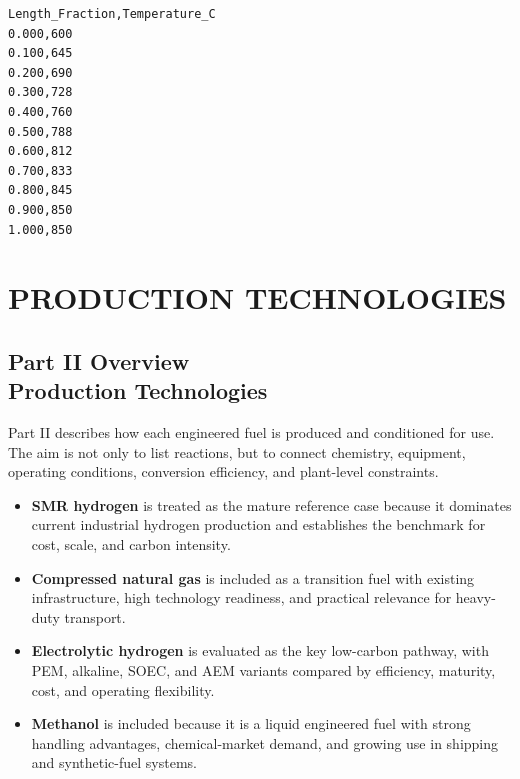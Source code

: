\documentclass[12pt,twoside,openany]{book}
\let\cleardoublepage\clearpage
\begin{document}
\begin{lstlisting}[language={}, caption={TEMP\_PROFILE.txt}, label=lst:temp]
Length_Fraction,Temperature_C
0.000,600
0.100,645
0.200,690
0.300,728
0.400,760
0.500,788
0.600,812
0.700,833
0.800,845
0.900,850
1.000,850
\end{lstlisting}


\part{PRODUCTION TECHNOLOGIES}

\cleardoublepage
{}
\chapter*{Part II Overview\\Production Technologies}

Part II describes how each engineered fuel is produced and conditioned for use. The aim is not only to list reactions, but to connect chemistry, equipment, operating conditions, conversion efficiency, and plant-level constraints.

\begin{itemize}
    \item \textbf{SMR hydrogen} is treated as the mature reference case because it dominates current industrial hydrogen production and establishes the benchmark for cost, scale, and carbon intensity.
    \item \textbf{Compressed natural gas} is included as a transition fuel with existing infrastructure, high technology readiness, and practical relevance for heavy-duty transport.
    \item \textbf{Electrolytic hydrogen} is evaluated as the key low-carbon pathway, with PEM, alkaline, SOEC, and AEM variants compared by efficiency, maturity, cost, and operating flexibility.
    \item \textbf{Methanol} is included because it is a liquid engineered fuel with strong handling advantages, chemical-market demand, and growing use in shipping and synthetic-fuel systems.
\end{itemize}
\end{document}
